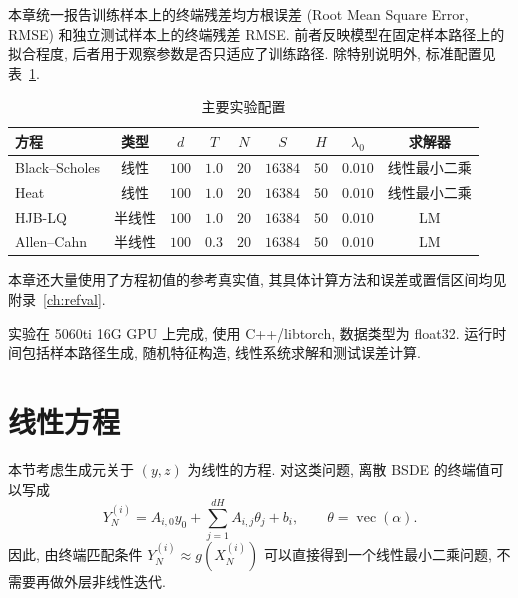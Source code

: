     本章统一报告训练样本上的终端残差均方根误差 (Root Mean Square Error, RMSE) 和独立测试样本上的终端残差 RMSE\@.
    前者反映模型在固定样本路径上的拟合程度, 后者用于观察参数是否只适应了训练路径.
    除特别说明外, 标准配置见表~\ref{tab:numerical_config}.

    \begin{table}[htbp]
      \centering
      \caption{主要实验配置}
      \label{tab:numerical_config}
      \begin{tabular}{lcccccccc}
        \toprule
        方程 & 类型 & $d$ & $T$ & $N$ & $S$ & $H$ & $\lambda_0$ & 求解器 \\
        \midrule
        Black--Scholes & 线性 & $100$ & $1.0$ & $20$ & $16384$ & $50$ & $0.010$ & 线性最小二乘 \\
        Heat & 线性 & $100$ & $1.0$ & $20$ & $16384$ & $50$ & $0.010$ & 线性最小二乘 \\
        HJB-LQ & 半线性 & $100$ & $1.0$ & $20$ & $16384$ & $50$ & $0.010$ & LM \\
        Allen--Cahn & 半线性 & $100$ & $0.3$ & $20$ & $16384$ & $50$ & $0.010$ & LM \\
        \bottomrule
      \end{tabular}
    \end{table}

    本章还大量使用了方程初值的参考真实值, 其具体计算方法和误差或置信区间均见附录~\ref{ch:refval}.

    实验在 5060ti 16G GPU 上完成, 使用 C++/libtorch, 数据类型为 float32.
    运行时间包括样本路径生成, 随机特征构造, 线性系统求解和测试误差计算.

  \section{线性方程}\label{sec:numerical_linear}
    本节考虑生成元关于 $(y,z)$ 为线性的方程.
    对这类问题, 离散 BSDE 的终端值可以写成
    \begin{equation}
      Y_N^{(i)}
      = A_{i,0} y_0
      + \sum_{j=1}^{dH} A_{i,j} \theta_j
      + b_i,
      \qquad
      \theta=\operatorname{vec}(\alpha).
      \label{eq:numerical_linear_terminal_form}
    \end{equation}
    因此, 由终端匹配条件 $Y_N^{(i)}\approx g(X_N^{(i)})$ 可以直接得到一个线性最小二乘问题,
    不需要再做外层非线性迭代.


